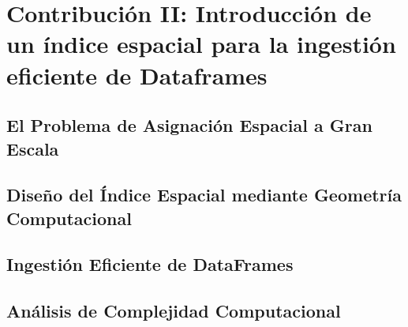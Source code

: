 \chapter{Contribución II: Introducción de un índice espacial para la ingestión eficiente de Dataframes}

\section{El Problema de Asignación Espacial a Gran Escala}

\section{Diseño del Índice Espacial mediante Geometría Computacional}

\section{Ingestión Eficiente de DataFrames}

\section{Análisis de Complejidad Computacional}
